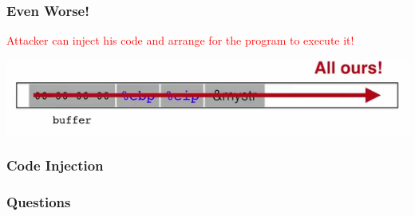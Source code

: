 \documentclass[serif,mathserif]{beamer}
\begin{document}
\begin{frame}[fragile]
  \frametitle{Even Worse!}
\textcolor{red}{Attacker can inject his code and arrange for the program to execute it!}
\begin{center}
\includegraphics[scale=0.35]{stackff9.png}
\end{center}

\end{frame}

\begin{frame}[fragile]
  \frametitle{Code Injection}

\end{frame}

\begin{frame}
  \frametitle{Questions}
\end{frame}
\end{document}
